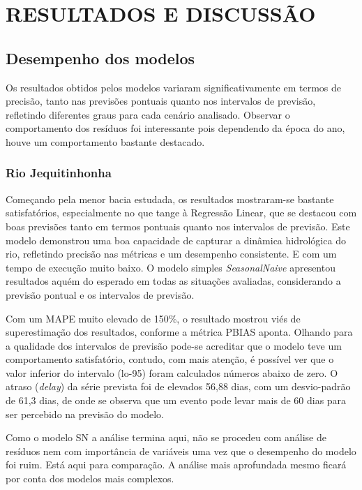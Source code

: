 \chapter{RESULTADOS E DISCUSS\~AO}
\label{cap:capitulo4}

\section{Desempenho dos modelos}

Os resultados obtidos pelos modelos variaram significativamente em termos de precisão, tanto nas previsões pontuais quanto nos intervalos de previsão, refletindo diferentes graus para cada cenário analisado. Observar o comportamento dos resíduos foi interessante pois dependendo da época do ano, houve um comportamento bastante destacado.

\subsection{Rio Jequitinhonha}

Começando pela menor bacia estudada, os resultados mostraram-se bastante satisfatórios, especialmente no que tange à Regressão Linear, que se destacou com boas previsões tanto em termos pontuais quanto nos intervalos de previsão. Este modelo demonstrou uma boa capacidade de capturar a dinâmica hidrológica do rio, refletindo precisão nas métricas e um desempenho consistente. E com um tempo de execução muito baixo. O modelo simples \textit{SeasonalNaive} apresentou resultados aquém do esperado em todas as situações avaliadas, considerando a previsão pontual e os intervalos de previsão.

Com um MAPE muito elevado de 150\%, o resultado mostrou viés de superestimação dos resultados, conforme a métrica PBIAS aponta. Olhando para a qualidade dos intervalos de previsão pode-se acreditar que o modelo teve um comportamento satisfatório, contudo, com mais atenção, é possível ver que o valor inferior do intervalo (lo-95) foram calculados números abaixo de zero. O atraso (\textit{delay}) da série prevista foi de elevados 56,88 dias, com um desvio-padrão de 61,3 dias, de onde se observa que um evento pode levar mais de 60 dias para ser percebido na previsão do modelo.

Como o modelo SN a análise termina aqui, não se procedeu com análise de resíduos nem com importância de variáveis uma vez que o desempenho do modelo foi ruim. Está aqui para comparação. A análise mais aprofundada mesmo ficará por conta dos modelos mais complexos.

